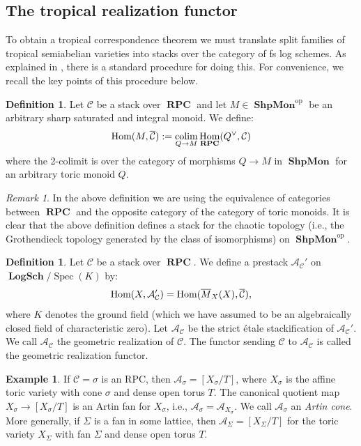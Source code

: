 \documentclass[11pt]{amsart}
\theoremstyle{definition}
\newtheorem{definition}[theorem]{Definition}
\newtheorem{example}[theorem]{Example}
\theoremstyle{remark}
\newtheorem{remark}[theorem]{Remark}
\DeclareMathOperator{\Spec}{Spec}
\def\op{\mathrm{op}}
\DeclareMathOperator{\LogSch}{\mathbf{LogSch}}
\DeclareMathOperator{\ShpMon}{\mathbf{ShpMon}}
\DeclareMathOperator{\RPC}{\mathbf{RPC}}
\def\colim{\qopname\relax m{colim}}
\DeclareMathOperator{\Hom}{\textup{Hom}}
\begin{document}
\subsection{The tropical realization functor}

To obtain a tropical correspondence theorem we must translate split families
of tropical semiabelian varieties into stacks over the category of
fs log schemes. As explained in
\cite{AModuliStackCavali2017}, there is a standard
procedure for doing this. For convenience, we recall the key points of this procedure
below.

\begin{definition}
	Let $\mathcal{C}$ be a stack over $\RPC$ and let $M\in \ShpMon^{\op}$ be an
	arbitrary sharp saturated and integral monoid. We define:
	$$\Hom(M,\overline{\mathcal{C}}):=\colim_{Q\to M}\Hom_{\RPC}(Q^{\vee},\mathcal{C})$$
	where the 2-colimit is over the category of morphisms
	$Q\to M$ in $\ShpMon$ for an arbitrary toric monoid $Q$.
\end{definition}

\begin{remark}
	In the above definition we are using the equivalence of categories
	between $\RPC$ and the opposite category of the category of
	toric monoids. It is clear that the above definition defines a stack for the chaotic topology (i.e., the Grothendieck topology generated
	by the class of isomorphisms) on $\ShpMon^{\op}$.
\end{remark}

\begin{definition}
	Let $\mathcal{C}$ be a stack over $\RPC$. We define a
	prestack $\mathcal{A}_{\mathcal{C}}'$ on $\LogSch/\Spec(K)$ by:
	$$\Hom(X,\mathcal{A}_{\mathcal{C}}')=\Hom(\overline{M}_X(X),\overline{\mathcal{C}}),$$
	where $K$ denotes the ground field (which we have assumed to
	be an algebraically closed field of characteristic zero).
	Let $\mathcal{A}_{\mathcal{C}}$ be the strict étale stackification of
	$\mathcal{A}_{\mathcal{C}}'$.
	We call $\mathcal{A}_{\mathcal{C}}$ the geometric realization
	of $\mathcal{C}$. The functor sending $\mathcal{C}$
	to $\mathcal{A}_{\mathcal{C}}$ is called the geometric realization
	functor.
\end{definition}

\begin{example}
	If $\mathcal{C}=\sigma$ is an RPC, then $\mathcal{A}_{\sigma}=[X_{\sigma}/T]$, where $X_{\sigma}$
	is the affine toric variety with cone $\sigma$ and dense open torus $T$. The canonical quotient
	map $X_{\sigma}\to [X_{\sigma}/T]$ is an Artin fan for $X_{\sigma}$, i.e., $\mathcal{A}_{\sigma}=\mathcal{A}_{X_{\sigma}}$.
	We call $\mathcal{A}_{\sigma}$ an \emph{Artin cone}.
	More generally, if $\Sigma$ is a fan in some lattice, then $\mathcal{A}_{\Sigma}=[X_{\Sigma}/T]$ for the toric
	variety $X_{\Sigma}$ with fan $\Sigma$ and dense open torus $T$.
\end{example}
\end{document}
